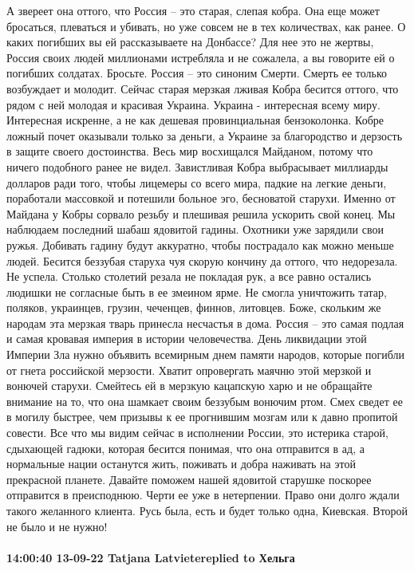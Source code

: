 А звереет она оттого, что Россия – это старая, слепая кобра. Она еще может бросаться, плеваться и убивать, но уже совсем не в тех количествах, как ранее.
О каких погибших вы ей рассказываете на Донбассе? Для нее это не жертвы, Россия своих людей миллионами истребляла и не сожалела, а вы говорите ей о погибших солдатах. Бросьте. Россия – это синоним Смерти. Смерть ее только возбуждает и молодит.
Сейчас старая мерзкая лживая Кобра бесится оттого, что рядом с ней молодая и красивая Украина. Украина - интересная всему миру. Интересная искренне, а не как дешевая провинциальная бензоколонка. Кобре ложный почет оказывали только за деньги, а Украине за благородство и дерзость в защите своего достоинства. Весь мир восхищался Майданом, потому что ничего подобного ранее не видел. Завистливая Кобра выбрасывает миллиарды долларов ради того, чтобы лицемеры со всего мира, падкие на легкие деньги, поработали массовкой и потешили больное эго, бесноватой старухи.
Именно от Майдана у Кобры сорвало резьбу и плешивая решила ускорить свой конец. Мы наблюдаем последний шабаш ядовитой гадины. Охотники уже зарядили свои ружья. Добивать гадину будут аккуратно, чтобы пострадало как можно меньше людей.
Бесится беззубая старуха чуя скорую кончину да оттого, что недорезала. Не успела. Столько столетий резала не покладая рук, а все равно остались людишки не согласные быть в ее змеином ярме. Не смогла уничтожить татар, поляков, украинцев, грузин, чеченцев, финнов, литовцев. Боже, скольким же народам эта мерзкая тварь принесла несчастья в дома.
Россия – это самая подлая и самая кровавая империя в истории человечества. День ликвидации этой Империи Зла нужно объявить всемирным днем памяти народов, которые погибли от гнета российской мерзости.
Хватит опровергать маячню этой мерзкой и вонючей старухи. Смейтесь ей в мерзкую кацапскую харю и не обращайте внимание на то, что она шамкает своим беззубым вонючим ртом. Смех сведет ее в могилу быстрее, чем призывы к ее прогнившим мозгам или к давно пропитой совести.
Все что мы видим сейчас в исполнении России, это истерика старой, сдыхающей гадюки, которая бесится понимая, что она отправится в ад, а нормальные нации останутся жить, поживать и добра наживать на этой прекрасной планете.
Давайте поможем нашей ядовитой старушке поскорее отправится в преисподнюю. Черти ее уже в нетерпении. Право они долго ждали такого желанного клиента.
Русь была, есть и будет только одна, Киевская. Второй не было и не нужно!

\paragraph{14:00:40 13-09-22 Tatjana Latvietereplied to Хельга}

